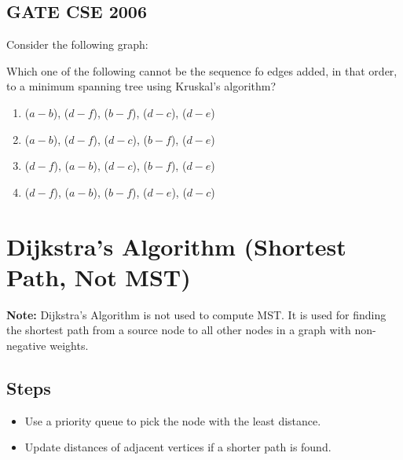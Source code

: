 \documentclass[a4paper,14pt]{extarticle}
\begin{document}
\newpage
\subsection{GATE CSE 2006}
Consider the following graph:



Which one of the following cannot be the sequence fo edges added, in that
order, to a minimum spanning tree using Kruskal's algorithm?

\begin{enumerate}[label=(\alph*)]
    \item ($a - b$), ($d - f$), ($b - f$), ($d - c$), ($d - e$)
    \item ($a - b$), ($d - f$), ($d - c$), ($b - f$), ($d - e$)
    \item ($d - f$), ($a - b$), ($d - c$), ($b - f$), ($d - e$)
    \item ($d - f$), ($a - b$), ($b - f$), ($d - e$), ($d - c$)
\end{enumerate}


\newpage
\section{Dijkstra's Algorithm (Shortest Path, Not MST)}

\textbf{Note:} Dijkstra's Algorithm is not used to compute MST. It is used for finding the shortest path from a source node to all other nodes in a graph with non-negative weights.

\subsection*{Steps}
\begin{itemize}
    \item Use a priority queue to pick the node with the least distance.
    \item Update distances of adjacent vertices if a shorter path is found.
\end{itemize}
\end{document}
